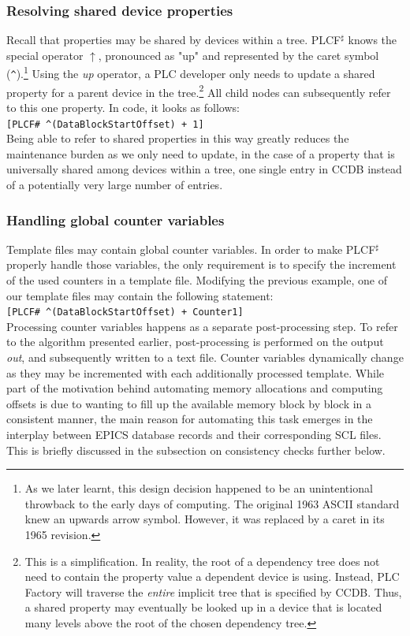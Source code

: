 \documentclass[a4paper,
              ]{jacow}
\begin{document}
\subsubsection{Resolving shared device properties}
Recall that properties may be shared by devices within a tree. PLCF$^\sharp$ knows the special operator $\uparrow$, pronounced as "up" and represented by the caret symbol (\texttt{\textasciicircum}).\footnote{As we later learnt, this design decision happened to be an unintentional throwback to the early days of computing. The original 1963 ASCII standard knew an upwards arrow symbol. However, it was replaced by a caret in its 1965 revision.} Using the \emph{up} operator, a PLC developer only needs to update a shared property for a parent device in the tree.\footnote{This is a simplification. In reality, the root of a dependency tree does not need to contain the property value a dependent device is using. Instead, PLC Factory will traverse the \emph{entire} implicit tree that is specified by CCDB. Thus, a shared property may eventually be looked up in a device that is located many levels above the root of the chosen dependency tree.} All child nodes can subsequently refer to this one property. In code, it looks as follows: \\

\texttt{[PLCF\# \textasciicircum(DataBlockStartOffset) + 1]} \\

Being able to refer to shared properties in this way greatly reduces the maintenance burden as we only need to update, in the case of a property that is universally shared among devices within a tree, one single entry in CCDB instead of a potentially very large number of entries.


\subsubsection{Handling global counter variables}
Template files may contain global counter variables. In order to make PLCF$^\sharp$ properly handle those variables, the only requirement is to specify the increment of the used counters in a template file. Modifying the previous example, one of our template files may contain the following statement:\\

\texttt{[PLCF\# \textasciicircum(DataBlockStartOffset) + Counter1]} \\

Processing counter variables happens as a separate post-processing step. To refer to the algorithm presented earlier, post-processing is performed on the output \emph{out}, and subsequently written to a text file. Counter variables dynamically change as they may be incremented with each additionally processed template. While part of the motivation behind automating memory allocations and computing offsets is due to wanting to fill up the available memory block by block in a consistent manner, the main reason for automating this task emerges in the interplay between EPICS database records and their corresponding SCL files. This is briefly discussed in the subsection on consistency checks further below.
\end{document}
